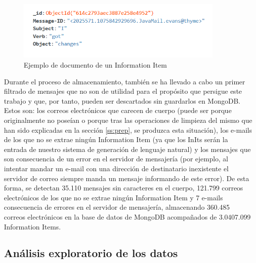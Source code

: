 \begin{figure}[h]
	\centering%
	\centerline{\includegraphics[width = 0.9\textwidth]{Imagenes/Bitmap/initexample.png}}%
	\caption{Ejemplo de documento de un Information Item}%
	\label{fig:initexample}
\end{figure}

Durante el proceso de almacenamiento, también se ha llevado a cabo un primer filtrado de mensajes que no son de utilidad para el propósito que persigue este trabajo y que, por tanto, pueden ser descartados sin guardarlos en MongoDB. Estos son: los correos electrónicos que carecen de cuerpo (puede ser porque originalmente no poseían o porque tras las operaciones de limpieza del mismo que han sido explicadas en la sección \ref{ss:prep}, se produzca esta situación), los e-mails de los que no se extrae ningún Information Item (ya que los InIts serán la entrada de nuestro sistema de generación de lenguaje natural) y los mensajes que son consecuencia de un error en el servidor de mensajería (por ejemplo, al intentar mandar un e-mail con una dirección de destinatario inexistente el servidor de correo siempre manda un mensaje informando de este error). De esta forma, se detectan 35.110 mensajes sin caracteres en el cuerpo, 121.799 correos electrónicos de los que no se extrae ningún Information Item y 7 e-mails consecuencia de errores en el servidor de mensajería, almacenando 360.485 correos electrónicos en la base de datos de MongoDB acompañados de 3.0407.099 Information Items.

\subsection{Análisis exploratorio de los datos}\label{ss:eda}

